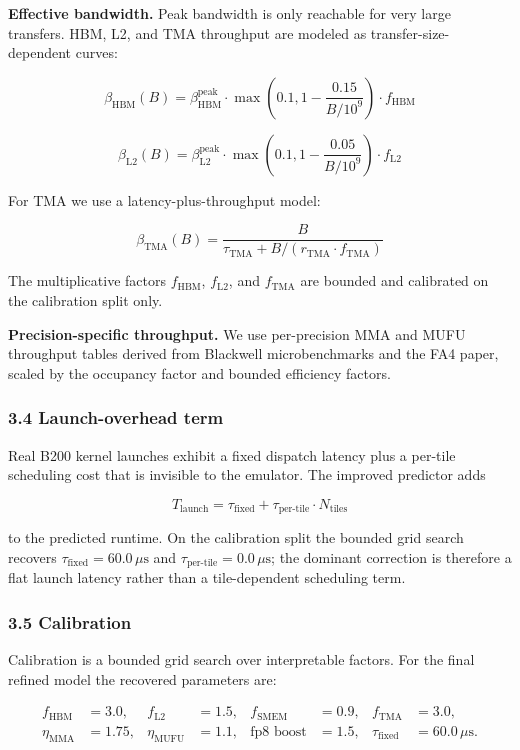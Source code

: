 \textbf{Effective bandwidth.} Peak bandwidth is only reachable for very
large transfers. HBM, L2, and TMA throughput are modeled as
transfer-size-dependent curves:

\[
\beta_{\text{HBM}}(B) = \beta_{\text{HBM}}^{\text{peak}} \cdot \max(0.1, 1 - \frac{0.15}{B / 10^9}) \cdot f_{\text{HBM}}
\]

\[
\beta_{\text{L2}}(B) = \beta_{\text{L2}}^{\text{peak}} \cdot \max(0.1, 1 - \frac{0.05}{B / 10^9}) \cdot f_{\text{L2}}
\]

For TMA we use a latency-plus-throughput model:

\[
\beta_{\text{TMA}}(B) = \frac{B}{\tau_{\text{TMA}} + B / (r_{\text{TMA}} \cdot f_{\text{TMA}})}
\]

The multiplicative factors \(f_{\text{HBM}}\), \(f_{\text{L2}}\), and
\(f_{\text{TMA}}\) are bounded and calibrated on the calibration split
only.

\textbf{Precision-specific throughput.} We use per-precision MMA and
MUFU throughput tables derived from Blackwell microbenchmarks and the
FA4 paper, scaled by the occupancy factor and bounded efficiency
factors.

\subsubsection{3.4 Launch-overhead term}\label{launch-overhead-term}

Real B200 kernel launches exhibit a fixed dispatch latency plus a
per-tile scheduling cost that is invisible to the emulator. The improved
predictor adds

\[
T_{\text{launch}} = \tau_{\text{fixed}} + \tau_{\text{per-tile}} \cdot N_{\text{tiles}}
\]

to the predicted runtime. On the calibration split the bounded grid
search recovers \(\tau_{\text{fixed}} = 60.0\,\mu\text{s}\) and
\(\tau_{\text{per-tile}} = 0.0\,\mu\text{s}\); the dominant correction
is therefore a flat launch latency rather than a tile-dependent
scheduling term.

\subsubsection{3.5 Calibration}\label{calibration}

Calibration is a bounded grid search over interpretable factors. For the
final refined model the recovered parameters are:

\[
\begin{aligned}
f_{\text{HBM}} &= 3.0, & f_{\text{L2}} &= 1.5, & f_{\text{SMEM}} &= 0.9, & f_{\text{TMA}} &= 3.0, \\
\eta_{\text{MMA}} &= 1.75, & \eta_{\text{MUFU}} &= 1.1, & \text{fp8 boost} &= 1.5, & \tau_{\text{fixed}} &= 60.0\,\mu\text{s}.
\end{aligned}
\]

